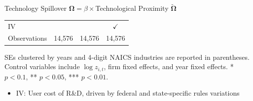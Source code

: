 \documentclass[
  10pt,
  aspectratio=169,   %
]{beamer}
\theoremstyle{plain}
\begin{document}
\begin{frame}{Technology Spillover $\bm{\Omega}=\beta\times$Technological Proximity $\bm{\widetilde{\Omega}}$ \hyperlink{first_stage}{}}
{\begin{center}
\begin{tabular}{lccc}
        IV               &                                                                 &              & $\checkmark$ \\
        Observations     & 14,576                                                          & 14,576       & 14,576       \\
        \hline\hline
      \end{tabular}
    \end{center}
    SEs clustered by years and 4-digit NAICS industries are reported in parentheses. Control variables include $\log z_{i,t}$, firm fixed effects, and year fixed effects.
      {*} $p<\text{0.1}$, {**} $p<\text{0.05}$, {***} $p<\text{0.01}$.}
  \begin{itemize}
    \item IV: User cost of R\&D, driven by federal and state-specific rules variations \citep{Bloom2013-pn}
  \end{itemize}
\end{frame}
\end{document}
